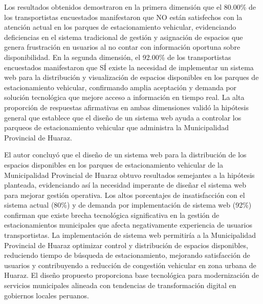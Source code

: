 \documentclass[12pt,a4paper]{article}
\begin{document}
Los resultados obtenidos demostraron en la primera dimensión que el 80.00\% de los transportistas encuestados manifestaron que NO están satisfechos con la atención actual en los parques de estacionamiento vehicular, evidenciando deficiencias en el sistema tradicional de gestión y asignación de espacios que genera frustración en usuarios al no contar con información oportuna sobre disponibilidad. En la segunda dimensión, el 92.00\% de los transportistas encuestados manifestaron que SÍ existe la necesidad de implementar un sistema web para la distribución y visualización de espacios disponibles en los parques de estacionamiento vehicular, confirmando amplia aceptación y demanda por solución tecnológica que mejore acceso a información en tiempo real. La alta proporción de respuestas afirmativas en ambas dimensiones validó la hipótesis general que establece que el diseño de un sistema web ayuda a controlar los parqueos de estacionamiento vehicular que administra la Municipalidad Provincial de Huaraz.

El autor concluyó que el diseño de un sistema web para la distribución de los espacios disponibles en los parques de estacionamiento vehicular de la Municipalidad Provincial de Huaraz obtuvo resultados semejantes a la hipótesis planteada, evidenciando así la necesidad imperante de diseñar el sistema web para mejorar gestión operativa. Los altos porcentajes de insatisfacción con el sistema actual (80\%) y de demanda por implementación de sistema web (92\%) confirman que existe brecha tecnológica significativa en la gestión de estacionamientos municipales que afecta negativamente experiencia de usuarios transportistas. La implementación de sistema web permitiría a la Municipalidad Provincial de Huaraz optimizar control y distribución de espacios disponibles, reduciendo tiempo de búsqueda de estacionamiento, mejorando satisfacción de usuarios y contribuyendo a reducción de congestión vehicular en zona urbana de Huaraz. El diseño propuesto proporciona base tecnológica para modernización de servicios municipales alineada con tendencias de transformación digital en gobiernos locales peruanos.
\end{document}
